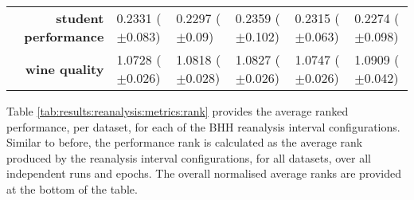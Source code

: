 \begin{table}[htb]
{\begin{tabular}{r|lllll}
			\textbf{student performance} & \cellcolor[rgb]{ .992,  .741,  .486}0.2331 ($\pm$0.083)     & \cellcolor[rgb]{ .725,  .839,  .498}0.2297 ($\pm$0.09)  & \cellcolor[rgb]{ .973,  .412,  .42}0.2359 ($\pm$0.102)  & \cellcolor[rgb]{ 1,  .922,  .518}0.2315 ($\pm$0.063)   & \cellcolor[rgb]{ .388,  .745,  .482}0.2274 ($\pm$0.098) \\
			\textbf{wine quality}        & \cellcolor[rgb]{ .388,  .745,  .482}1.0728 ($\pm$0.026)     & \cellcolor[rgb]{ 1,  .922,  .518}1.0818 ($\pm$0.028)    & \cellcolor[rgb]{ 1,  .871,  .51}1.0827 ($\pm$0.026)     & \cellcolor[rgb]{ .514,  .78,  .486}1.0747 ($\pm$0.026) & \cellcolor[rgb]{ .973,  .412,  .42}1.0909 ($\pm$0.042)  \\
		\end{tabular}%
	}
\end{table}%

Table \ref{tab:results:reanalysis:metrics:rank} provides the average ranked performance, per dataset, for each of the \acs{BHH} reanalysis interval configurations. Similar to before, the performance rank is calculated as the average rank produced by the reanalysis interval configurations, for all datasets, over all independent runs and epochs. The overall normalised average ranks are provided at the bottom of the table.

